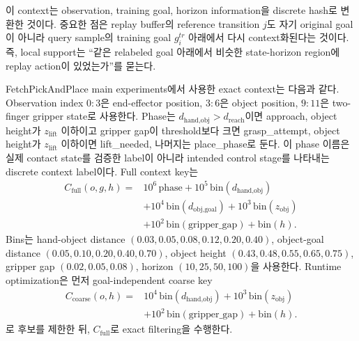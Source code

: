 \documentclass[letterpaper]{article}
\begin{document}
이 context는 observation, training goal, horizon information을 discrete hash로 변환한 것이다. 중요한 점은 replay buffer의 reference transition \(j\)도 자기 original goal이 아니라 query sample의 training goal \(g_i^{tr}\) 아래에서 다시 context화된다는 것이다. 즉, local support는 ``같은 relabeled goal 아래에서 비슷한 state-horizon region에 replay action이 있었는가''를 묻는다.

FetchPickAndPlace main experiments에서 사용한 exact context는 다음과 같다. Observation index \(0{:}3\)은 end-effector position, \(3{:}6\)은 object position, \(9{:}11\)은 two-finger gripper state로 사용한다. Phase는 \(d_{\text{hand,obj}}>d_{\text{reach}}\)이면 approach, object height가 \(z_{\text{lift}}\) 이하이고 gripper gap이 threshold보다 크면 grasp\_attempt, object height가 \(z_{\text{lift}}\) 이하이면 lift\_needed, 나머지는 place\_phase로 둔다. 이 phase 이름은 실제 contact state를 검증한 label이 아니라 intended control stage를 나타내는 discrete context label이다. Full context key는
\begin{equation}
\begin{aligned}
C_{\mathrm{full}}(o,g,h)=&
10^6\,\mathrm{phase}
+10^5\,\mathrm{bin}(d_{\text{hand,obj}})\\
&+10^4\,\mathrm{bin}(d_{\text{obj,goal}})
+10^3\,\mathrm{bin}(z_{\text{obj}})\\
&+10^2\,\mathrm{bin}(\mathrm{gripper\_gap})
+\mathrm{bin}(h).
\end{aligned}
\end{equation}
Bins는 hand-object distance \((0.03,0.05,0.08,0.12,0.20,0.40)\), object-goal distance \((0.05,0.10,0.20,0.40,0.70)\), object height \((0.43,0.48,0.55,0.65,0.75)\), gripper gap \((0.02,0.05,0.08)\), horizon \((10,25,50,100)\)을 사용한다. Runtime optimization은 먼저 goal-independent coarse key
\begin{equation}
\begin{aligned}
C_{\mathrm{coarse}}(o,h)=
&10^4\,\mathrm{bin}(d_{\text{hand,obj}})
+10^3\,\mathrm{bin}(z_{\text{obj}})\\
&+10^2\,\mathrm{bin}(\mathrm{gripper\_gap})
+\mathrm{bin}(h).
\end{aligned}
\end{equation}
로 후보를 제한한 뒤, \(C_{\mathrm{full}}\)로 exact filtering을 수행한다.
\end{document}
